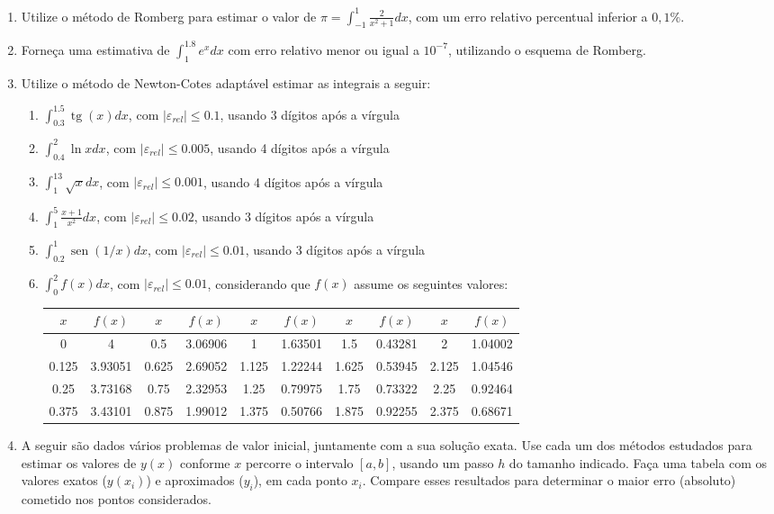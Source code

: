 \documentclass[12pt,a4paper]{article}
\newcommand*\sen{\operatorname{sen}}
\newcommand*\tg{\operatorname{tg}}
\begin{document}
\begin{enumerate}
\item Utilize o método de Romberg para estimar o valor de $\pi = \int_{-1}^1 \frac{2}{x^2 + 1} dx$, com um erro relativo percentual inferior a $0,1\%$.

\item Forneça uma estimativa de $\int_1^{1.8} e^x dx$ com erro relativo menor ou igual a $10^{-7}$, utilizando o esquema de Romberg.

\item Utilize o método de Newton-Cotes adaptável estimar as integrais a seguir:
\begin{enumerate}
\item $\int_{0.3}^{1.5} \tg(x) dx$, com $|\varepsilon_{rel}| \leq 0.1$, usando 3 dígitos após a vírgula
\item $\int_{0.4}^{2} \ln{x} dx$, com $|\varepsilon_{rel}| \leq 0.005$, usando 4 dígitos após a vírgula
\item $\int_{1}^{13} \sqrt{x} dx$, com $|\varepsilon_{rel}| \leq 0.001$, usando 4 dígitos após a vírgula
\item $\int_1^5 \frac{x+1}{x^2} dx$, com $|\varepsilon_{rel}| \leq 0.02$, usando 3 dígitos após a vírgula
\item $\int_{0.2}^{1} \sen(1/x) dx$, com $|\varepsilon_{rel}| \leq 0.01$, usando 3 dígitos após a vírgula
\item $\int_{0}^{2} f(x) dx$, com $|\varepsilon_{rel}| \leq 0.01$, considerando que $f(x)$ assume os seguintes valores:
\begin{center}\hspace{-1cm}
\begin{tabular}{|c|c||c|c||c|c||c|c||c|c|}
\hline
$x$ & $f(x)$ & $x$ & $f(x)$ & $x$ & $f(x)$ & $x$ & $f(x)$ & $x$ & $f(x)$\\
\hline
0 & 4 & 0.5 & 3.06906 & 1 & 1.63501 & 1.5 & 0.43281 & 2 & 1.04002\\
\hline
0.125 & 3.93051 & 0.625 & 2.69052 & 1.125 & 1.22244 & 1.625 & 0.53945 & 2.125 & 1.04546\\
\hline
0.25 & 3.73168 & 0.75 & 2.32953 & 1.25 & 0.79975 & 1.75 & 0.73322 & 2.25 & 0.92464\\
\hline
0.375 & 3.43101 & 0.875 & 1.99012 & 1.375 & 0.50766 & 1.875 & 0.92255 & 2.375 & 0.68671\\
\hline
\end{tabular}
\end{center}
\end{enumerate}
\item A seguir são dados vários problemas de valor inicial, juntamente com a sua solução exata. Use cada um dos métodos estudados para estimar os valores de $y(x)$ conforme $x$ percorre o intervalo $[a,b]$, usando um passo $h$ do tamanho indicado. Faça uma tabela com os valores exatos ($y(x_i)$) e aproximados ($y_i$), em cada ponto $x_i$. Compare esses resultados para determinar o maior erro (absoluto) cometido nos pontos considerados.

\end{enumerate}
\end{document}
